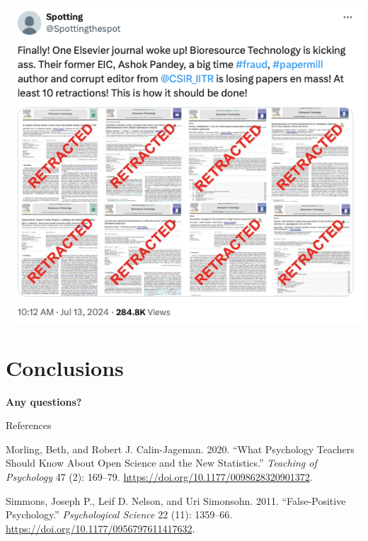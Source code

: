 \documentclass[
  ignorenonframetext,
  aspectratio=169,
]{beamer}
\newlength{\cslhangindent}
\newenvironment{CSLReferences}[2] %
 {\begin{list}{}{%
  \setlength{\itemindent}{0pt}
  \setlength{\leftmargin}{0pt}
  \setlength{\parsep}{0pt}
  \ifodd #1
   \setlength{\leftmargin}{\cslhangindent}
   \setlength{\itemindent}{-1\cslhangindent}
  \fi
  \setlength{\itemsep}{#2\baselineskip}}}
 {\end{list}}
\begin{document}
\begin{frame}{}
\label{section-5}
\begin{center}
\includegraphics{figs/retractions.png}
\end{center}
\end{frame}

\section{Conclusions}\label{conclusions}

\begin{frame}{}
\label{section-6}
\textbf{Any questions?}
\end{frame}

\begin{frame}{References}
\label{references}
\label{refs}
\begin{CSLReferences}{1}{0}
Morling, Beth, and Robert J. Calin-Jageman. 2020. {``What Psychology
Teachers Should Know About Open Science and the New Statistics.''}
\emph{Teaching of Psychology} 47 (2): 169--79.
\url{https://doi.org/10.1177/0098628320901372}.

Simmons, Joseph P., Leif D. Nelson, and Uri Simonsohn. 2011.
{``False-Positive Psychology.''} \emph{Psychological Science} 22 (11):
1359--66. \url{https://doi.org/10.1177/0956797611417632}.

\end{CSLReferences}
\end{frame}
\end{document}
